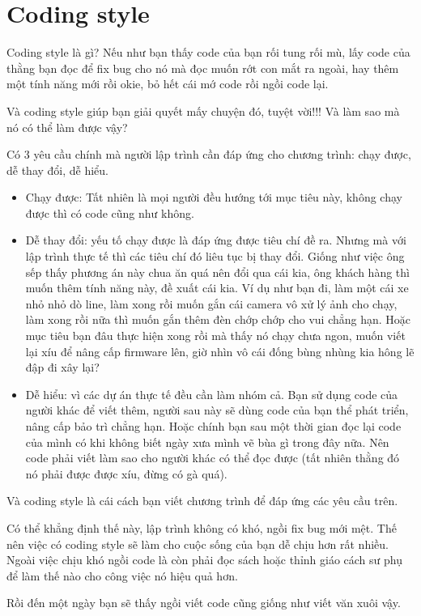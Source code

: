 \chapter{Coding style}

Coding style là gì? Nếu như bạn thấy code của bạn rối tung rối mù, lấy code của thằng bạn đọc để fix bug cho nó mà đọc muốn rớt con mắt ra ngoài, hay thêm một tính năng mới rồi okie, bỏ hết cái mớ code rồi ngồi code lại.

Và coding style giúp bạn giải quyết mấy chuyện đó, tuyệt vời!!! Và làm sao mà nó có thể làm được vậy?

Có 3 yêu cầu chính mà người lập trình cần đáp ứng cho chương trình: chạy được, dễ thay đổi, dễ hiểu.
\begin{itemize}
  \item Chạy được: Tất nhiên là mọi người đều hướng tới mục tiêu này, không chạy được thì có code cũng như không.
  \item Dễ thay đổi: yếu tố chạy được là đáp ứng được tiêu chí đề ra. Nhưng mà với lập trình thực tế thì các tiêu chí đó liêu tục bị thay đổi. Giống như việc ông sếp thấy phương án này chua ăn quá nên đổi qua cái kia, ông khách hàng thì muốn thêm tính năng này, đề xuất cái kia. Ví dụ như bạn đi, làm một cái xe nhỏ nhỏ dò line, làm xong rồi muốn gắn cái camera vô xử lý ảnh cho chạy, làm xong rồi nữa thì muốn gắn thêm đèn chớp chớp cho vui chẳng hạn. Hoặc mục tiêu bạn đâu thực hiện xong rồi mà thấy nó chạy chưa ngon, muốn viết lại xíu để nâng cấp firmware lên, giờ nhìn vô cái đống bùng nhùng kia hông lẽ đập đi xây lại?
	\item Dễ hiểu: vì các dự án thực tế đều cần làm nhóm cả. Bạn sử dụng code của người khác để viết thêm, người sau này sẽ dùng code của bạn thể phát triển, nâng cấp bảo trì chẳng hạn. Hoặc chính bạn sau một thời gian đọc lại code của mình có khi không biết ngày xưa mình vẽ bùa gì trong đây nữa. Nên code phải viết làm sao cho người khác có thể đọc được (tất nhiên thằng đó nó phải được được xíu, đừng có gà quá).
\end{itemize}

Và coding style là cái cách bạn viết chương trình để đáp ứng các yêu cầu trên.

Có thể khẳng định thế này, lập trình không có khó, ngồi fix bug mới mệt. Thế nên việc có coding style sẽ làm cho cuộc sống của bạn dễ chịu hơn rất nhiều. Ngoài việc chịu khó ngồi code là còn phải đọc sách hoặc thỉnh giáo cách sư phụ để làm thế nào cho công việc nó hiệu quả hơn.

Rồi đến một ngày bạn sẽ thấy ngồi viết code cũng giống như viết văn xuôi vậy.
\newpage
